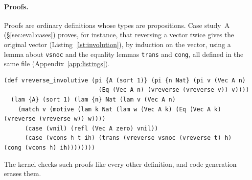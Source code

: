 \paragraph{Proofs.}
Proofs are ordinary definitions whose types are propositions.
Case study~A (\S\ref{sec:eval:cases}) proves, for instance, that reversing a vector twice gives the original vector (Listing~\ref{lst:involution}), by induction on the vector, using a lemma about \lstinline|vsnoc| and the equality lemmas \lstinline|trans| and \lstinline|cong|, all defined in the same file (Appendix~\ref{app:listings}).
\begin{lstlisting}[float=*,caption={The involution of \texttt{vreverse}, a kernel-checked proof (\texttt{case\_studies/lrl/vectors.lrl}).},label={lst:involution}]
(def vreverse_involutive (pi {A (sort 1)} (pi {n Nat} (pi v (Vec A n)
                           (Eq (Vec A n) (vreverse (vreverse v)) v))))
  (lam {A} (sort 1) (lam {n} Nat (lam v (Vec A n)
    (match v (motive (lam k Nat (lam w (Vec A k) (Eq (Vec A k) (vreverse (vreverse w)) w))))
      (case (vnil) (refl (Vec A zero) vnil))
      (case (vcons h t ih) (trans (vreverse_vsnoc (vreverse t) h) (cong (vcons h) ih))))))))
\end{lstlisting}
The kernel checks such proofs like every other definition, and code generation erases them.
